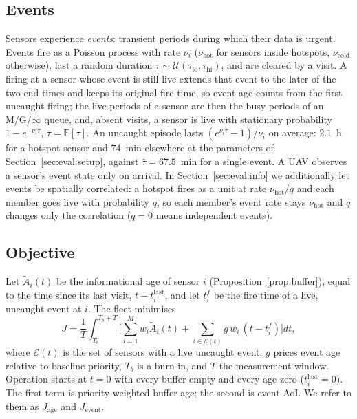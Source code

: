 \documentclass[journal,outdir=./]{IEEEtran}
\begin{document}
\subsection{Events}
Sensors experience \emph{events}: transient periods during which their data is urgent. Events fire as a Poisson process with rate $\nu_i$ ($\nu_{\mathrm{hot}}$ for sensors inside hotspots, $\nu_{\mathrm{cold}}$ otherwise), last a random duration $\tau\sim\mathcal{U}(\tau_{\mathrm{lo}},\tau_{\mathrm{hi}})$, and are cleared by a visit. A firing at a sensor whose event is still live extends that event to the later of the two end times and keeps its original fire time, so event age counts from the first uncaught firing; the live periods of a sensor are then the busy periods of an M/G/$\infty$ queue, and, absent visits, a sensor is live with stationary probability $1-e^{-\nu_i\bar\tau}$, $\bar\tau=\mathbb{E}[\tau]$. An uncaught episode lasts $(e^{\nu_i\bar\tau}-1)/\nu_i$ on average: $2.1$~h for a hotspot sensor and $74$~min elsewhere at the parameters of Section~\ref{sec:eval:setup}, against $\bar\tau=67.5$~min for a single event. A UAV observes a sensor's event state only on arrival. In Section~\ref{sec:eval:info} we additionally let events be spatially correlated: a hotspot fires as a unit at rate $\nu_{\mathrm{hot}}/q$ and each member goes live with probability $q$, so each member's event rate stays $\nu_{\mathrm{hot}}$ and $q$ changes only the correlation ($q=0$ means independent events).

\subsection{Objective}
Let $\tilde A_i(t)$ be the informational age of sensor $i$ (Proposition~\ref{prop:buffer}), equal to the time since its last visit, $t-t^{\mathrm{last}}_i$, and let $t^{f}_i$ be the fire time of a live, uncaught event at $i$. The fleet minimises
\begin{equation}\label{eq:J}
J=\frac{1}{T}\int_{T_b}^{T_b+T}\Big[\sum_{i=1}^{M} w_i\tilde A_i(t)+\sum_{i\in\mathcal{E}(t)} g\,w_i\,(t-t^{f}_i)\Big]dt,
\end{equation}
where $\mathcal{E}(t)$ is the set of sensors with a live uncaught event, $g$ prices event age relative to baseline priority, $T_b$ is a burn-in, and $T$ the measurement window. Operation starts at $t=0$ with every buffer empty and every age zero ($t^{\mathrm{last}}_i=0$). The first term is priority-weighted buffer age; the second is event AoI. We refer to them as $J_{\mathrm{age}}$ and $J_{\mathrm{event}}$.
\end{document}
